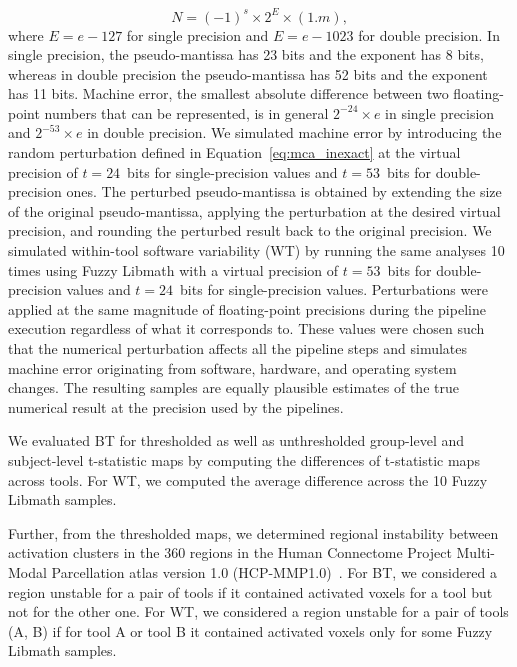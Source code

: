 \documentclass[11pt,onecolumn]{article}
\begin{document}
\begin{equation}
  N = (-1)^s \times 2^E \times (1.m),
\end{equation}
where $E=e-127$ for single precision and $E=e-1023$ for double precision.
In single precision, the pseudo-mantissa has 23 bits and the exponent has 8 bits, whereas in
double precision the pseudo-mantissa has 52 bits and the exponent has 11 bits.
Machine error, the smallest absolute difference between two
floating-point numbers that can be represented, is in general $2^{-24}\times e$ in
single precision and $2^{-53}\times e$ in double precision.
We simulated machine error by introducing the random perturbation defined
in Equation~\ref{eq:mca_inexact} at the virtual precision of $t=24$~bits for single-precision
values and $t=53$~bits for double-precision ones. The perturbed pseudo-mantissa
is obtained by extending the size of the original pseudo-mantissa, applying the perturbation
at the desired virtual precision, and rounding the perturbed result back to the original precision.
We simulated within-tool software variability (WT) by running the same analyses 10
times using Fuzzy Libmath with a virtual precision of $t=53$~bits for
double-precision values and $t=24$~bits for single-precision values. 
Perturbations were applied at the same magnitude of floating-point precisions during the pipeline execution
regardless of what it corresponds to.
These values were chosen such that the numerical perturbation affects all the pipeline steps and simulates
machine error originating from software, hardware, and operating system changes.
The resulting samples are equally plausible estimates of
the true numerical result at the precision used by the pipelines. 

We evaluated BT for thresholded as well as unthresholded
group-level and subject-level t-statistic maps by computing the
differences of t-statistic maps across tools. For WT, we computed the
average difference across the 10 Fuzzy Libmath samples.

Further, from the thresholded maps, we determined regional instability
between activation clusters in the 360 regions in the Human Connectome
Project Multi-Modal Parcellation atlas version 1.0
(HCP-MMP1.0)~\cite{glasser2016multi}. For BT, we considered a region
unstable for a pair of tools if it contained activated voxels for a tool
but not for the other one. For WT, we considered a region unstable for a
pair of tools (A, B) if for tool A or tool B it contained activated voxels only for some Fuzzy Libmath
samples.
\end{document}
